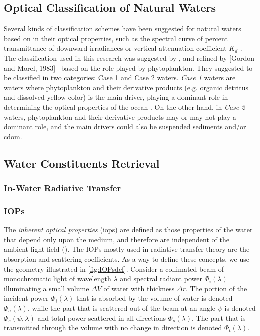 \subsection{Optical Classification of Natural Waters}

Several kinds of classification schemes have been suggested for natural waters based on in their optical properties, such as the spectral curve of percent transmittance of downward irradiances or vertical attenuation coefficient $K_d$ \cite{Kirk1983}. The classification used in this research was suggested by \cite{Morel:1977rw}, and refined by [Gordon and Morel, 1983]~ based on the role played by phytoplankton. They suggested to be classified in two categories: Case 1 and Case 2 waters. {\it Case 1} waters are waters where phytoplankton and their derivative products (e.g. organic detritus and dissolved yellow color) is the main driver, playing a dominant role in determining the optical properties of the ocean \cite{Kirk1983}. On the other hand, in {\it Case 2} waters, phytoplankton and their derivative products may or may not play a dominant role, and the main drivers could also be suspended sediments and/or \gls{cdom}.


\subsection{Water Constituents Retrieval}
\subsubsection{In-Water Radiative Transfer}
\subsubsection*{IOPs}
The {\it inherent optical properties} (\acrshort{iops}) are defined as those properties of the water that depend only upon the medium, and therefore are independent of the ambient light field (\cite{Mobley:2001}). The IOPs mostly used in radiative transfer theory are the absorption and scattering coefficients. As a way to define these concepts, we use the geometry illustrated in \autoref{fig:IOPsdef}. Consider a collimated beam of monochromatic light of wavelength $\lambda$ and spectral radiant power $\Phi_i(\lambda)$ illuminating a small volume $\Delta V$ of water with thickness $\Delta r$. The portion of the incident power $\Phi_i(\lambda)$ that is absorbed by the volume of water is denoted $\Phi_a(\lambda)$, while the part that is scattered out of the beam at an angle $\psi$ is denoted $\Phi_s(\psi,\lambda)$ and total power scattered in all directions $\Phi_s(\lambda)$. The part that is transmitted through the volume with no change in direction is denoted $\Phi_t(\lambda)$. 

